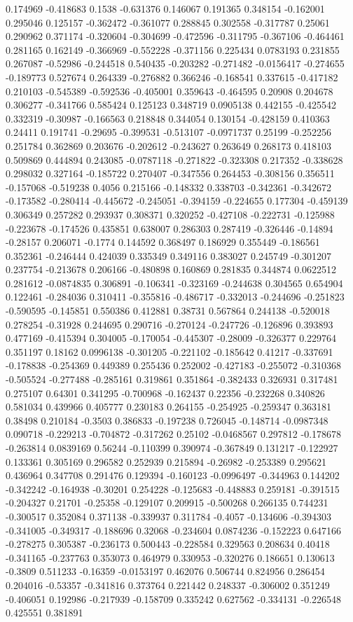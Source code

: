 0.174969 -0.418683 0.1538 -0.631376 0.146067 0.191365 0.348154 -0.162001 0.295046 0.125157 -0.362472 -0.361077 0.288845 0.302558 -0.317787 0.25061 0.290962 0.371174 -0.320604 -0.304699 -0.472596 -0.311795 -0.367106 -0.464461 0.281165 0.162149 -0.366969 -0.552228 -0.371156 0.225434 0.0783193 0.231855 0.267087 -0.52986 -0.244518 0.540435 -0.203282 -0.271482 -0.0156417 -0.274655 -0.189773 0.527674 0.264339 -0.276882 0.366246 -0.168541 0.337615 -0.417182 0.210103 -0.545389 -0.592536 -0.405001 0.359643 -0.464595 0.20908 0.204678 0.306277 -0.341766 0.585424 0.125123 0.348719 0.0905138 0.442155 -0.425542 0.332319 -0.30987 -0.166563 0.218848 0.344054 0.130154 -0.428159 0.410363 0.24411 0.191741 -0.29695 -0.399531 -0.513107 -0.0971737 0.25199 -0.252256 0.251784 0.362869 0.203676 -0.202612 -0.243627 0.263649 0.268173 0.418103 0.509869 0.444894 0.243085 -0.0787118 -0.271822 -0.323308 0.217352 -0.338628 0.298032 0.327164 -0.185722 0.270407 -0.347556 0.264453 -0.308156 0.356511 -0.157068 -0.519238 0.4056 0.215166 -0.148332 0.338703 -0.342361 -0.342672 -0.173582 -0.280414 -0.445672 -0.245051 -0.394159 -0.224655 0.177304 -0.459139 0.306349 0.257282 0.293937 0.308371 0.320252 -0.427108 -0.222731 -0.125988 -0.223678 -0.174526 0.435851 0.638007 0.286303 0.287419 -0.326446 -0.14894 -0.28157 0.206071 -0.1774 0.144592 0.368497 0.186929 0.355449 -0.186561 0.352361 -0.246444 0.424039 0.335349 0.349116 0.383027 0.245749 -0.301207 0.237754 -0.213678 0.206166 -0.480898 0.160869 0.281835 0.344874 0.0622512 0.281612 -0.0874835 0.306891 -0.106341 -0.323169 -0.244638 0.304565 0.654904 0.122461 -0.284036 0.310411 -0.355816 -0.486717 -0.332013 -0.244696 -0.251823 -0.590595 -0.145851 0.550386 0.412881 0.38731 0.567864 0.244138 -0.520018 0.278254 -0.31928 0.244695 0.290716 -0.270124 -0.247726 -0.126896 0.393893 0.477169 -0.415394 0.304005 -0.170054 -0.445307 -0.28009 -0.326377 0.229764 0.351197 0.18162 0.0996138 -0.301205 -0.221102 -0.185642 0.41217 -0.337691 -0.178838 -0.254369 0.449389 0.255436 0.252002 -0.427183 -0.255072 -0.310368 -0.505524 -0.277488 -0.285161 0.319861 0.351864 -0.382433 0.326931 0.317481 0.275107 0.64301 0.341295 -0.700968 -0.162437 0.22356 -0.232268 0.340826 0.581034 0.439966 0.405777 0.230183 0.264155 -0.254925 -0.259347 0.363181 0.38498 0.210184 -0.3503 0.386833 -0.197238 0.726045 -0.148714 -0.0987348 0.090718 -0.229213 -0.704872 -0.317262 0.25102 -0.0468567 0.297812 -0.178678 -0.263814 0.0839169 0.56244 -0.110399 0.390974 -0.367849 0.131217 -0.122927 0.133361 0.305169 0.296582 0.252939 0.215894 -0.26982 -0.253389 0.295621 0.436964 0.347708 0.291476 0.129394 -0.160123 -0.0996497 -0.344963 0.144202 -0.342242 -0.164938 -0.30201 0.254228 -0.125683 -0.448883 0.259181 -0.391515 -0.204327 0.21701 -0.25358 -0.129107 0.209915 -0.500268 0.266135 0.744231 -0.300517 0.352084 0.371138 -0.339937 0.311784 -0.4057 -0.134606 -0.394303 -0.341005 -0.349317 -0.188696 0.32068 -0.234604 0.0874236 -0.152223 0.647166 -0.278275 0.305387 -0.236173 0.500443 -0.228584 0.329563 0.208634 0.40418 -0.341165 -0.237763 0.353073 0.464979 0.330953 -0.320276 0.186651 0.130613 -0.3809 0.511233 -0.16359 -0.0153197 0.462076 0.506744 0.824956 0.286454 0.204016 -0.53357 -0.341816 0.373764 0.221442 0.248337 -0.306002 0.351249 -0.406051 0.192986 -0.217939 -0.158709 0.335242 0.627562 -0.334131 -0.226548 0.425551 0.381891 